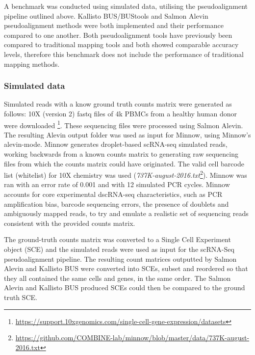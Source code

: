 A benchmark was conducted using simulated data, utilising the pseudoalignment pipeline outlined above.
Kallisto BUS/BUStools and Salmon Alevin pseudoalignment methods were both implemented and their performance compared to one another.
Both pseudoalignment tools have previously been compared to traditional mapping tools \cite{melsted2018barcode, srivastava2019alevin} and both showed comparable accuracy levels, therefore this benchmark does not include the performance of traditional mapping methods.

\subsubsection{Simulated data}
Simulated reads with a know ground truth counts matrix were generated as follows:
10X (version 2) fastq files of 4k PBMCs from a healthy human donor were downloaded  \footnote{\url{https://support.10xgenomics.com/single-cell-gene-expression/datasets}}.
These sequencing files were processed using Salmon Alevin.
The resulting Alevin output folder was used as input for Minnow, using Minnow's alevin-mode.
Minnow generates droplet-based scRNA-seq simulated reads, working backwards from a known counts matrix to generating raw sequencing files from which the counts matrix could have originated.
The valid cell barcode list (whitelist) for 10X chemistry was used (\textit{737K-august-2016.txt}\footnote{\url{https://github.com/COMBINE-lab/minnow/blob/master/data/737K-august-2016.txt}}).
Minnow was ran with an error rate of 0.001 and with 12 simulated PCR cycles.
Minnow accounts for core experimental dscRNA-seq characteristics, such as PCR amplification bias, barcode sequencing errors, the presence of doublets and ambiguously mapped reads, to try and emulate a realistic set of sequencing reads consistent with the provided counts matrix.

The ground-truth counts matrix was converted to a Single Cell Experiment object (SCE) and the simulated reads were used as input for the scRNA-Seq pseudoalignment pipeline.
The resulting count matrices outputted by Salmon Alevin and Kallisto BUS were converted into SCEs, subset and reordered so that they all contained the same cells and genes, in the same order.
The Salmon Alevin and Kallisto BUS produced SCEs could then be compared to the ground truth SCE.

